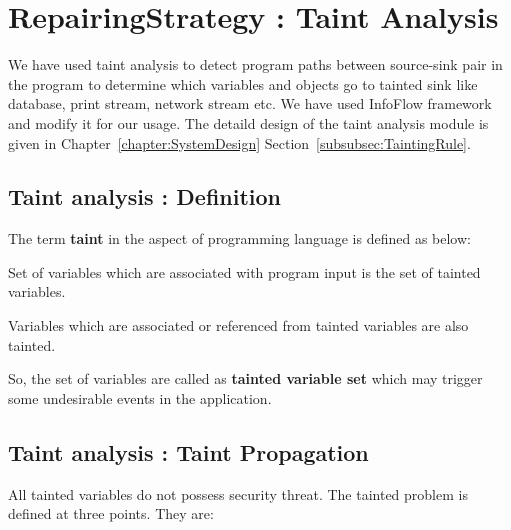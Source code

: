 

\chapter{RepairingStrategy : Taint Analysis}
\label{chapter:callGraph}

We have used taint analysis to detect program paths between source-sink pair in
the program to determine which variables and objects go to tainted sink like
database, print stream, network stream etc. We have used InfoFlow framework and
modify it for our usage. The detaild design of the taint analysis module is
given in Chapter~\ref{chapter:SystemDesign}
Section~\ref{subsubsec:TaintingRule}. 

\section{Taint analysis : Definition}
\label{sec:TaintAnalysisDef}

The term \textbf{taint} in the aspect of programming language is defined as
below:
\begin{definition}
Set of variables which are associated with program input is the set of tainted
variables.
\end{definition}
\begin{definition}
Variables which are associated or referenced from tainted variables are also
tainted.
\end{definition}
So, the set of variables are called as \textbf{tainted variable set} which may
trigger some undesirable events in the application.

\section{Taint analysis : Taint Propagation}
\label{sec:TaintPropagation}

All tainted variables do not possess security threat. The tainted problem is
defined at three points. They are:

